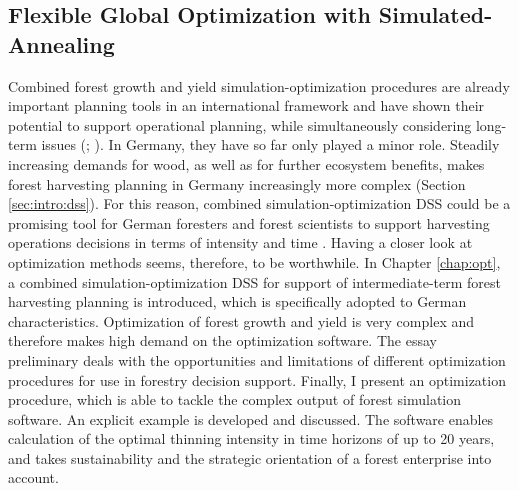 \subsection{Flexible Global Optimization with Simulated-Annealing}
\label{subsec:intro:struct:opt}
Combined forest growth and yield si\-mu\-la\-tion-op\-ti\-mi\-za\-tion procedures are already important planning tools in an international framework \citep[p. 1]{hoganson_2015} and have shown their potential to support operational planning, while simultaneously considering long-term issues (\citealp[p. 1]{hoganson_2015}; \citealp[p. 1081]{pretzsch_2008}). In Germany, they have so far only played a minor role. Steadily increasing demands for wood, as well as for further ecosystem benefits, makes forest harvesting planning in Germany increasingly more complex (Section \ref{sec:intro:dss}). For this reason, combined si\-mu\-la\-tion-op\-ti\-mi\-za\-tion DSS could be a promising tool for German foresters and forest scientists to support harvesting operations decisions in terms of intensity and time \citet[p. 347-348]{mohring_2010}. Having a closer look at optimization methods seems, therefore, to be worthwhile. In Chapter \ref{chap:opt}, a combined si\-mu\-la\-tion-op\-ti\-mi\-za\-tion DSS for support of intermediate-term forest harvesting planning is introduced, which is specifically adopted to German characteristics. Optimization of forest growth and yield is very complex and therefore makes high demand on the optimization software. The essay preliminary deals with the opportunities and limitations of different optimization procedures for use in forestry decision support. Finally, I present an optimization procedure, which is able to tackle the complex output of forest simulation software. An explicit example is developed and discussed. The software enables calculation of the optimal thinning intensity in time horizons of up to 20 years, and takes sustainability and the strategic orientation of a forest enterprise into account.

